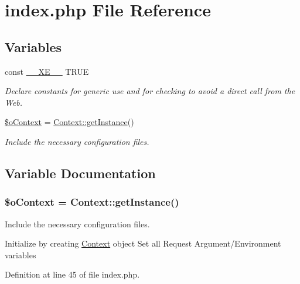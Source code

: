 \hypertarget{index_8php}{}\section{index.\+php File Reference}
\label{index_8php}
\subsection*{Variables}
\begin{DoxyCompactItemize}
\item 
const \hyperlink{index_8php_a697de427d83b791899ae45d555377756}{\+\_\+\+\_\+\+X\+E\+\_\+\+\_\+} T\+R\+UE
\begin{DoxyCompactList}\small\item\em Declare constants for generic use and for checking to avoid a direct call from the Web. \end{DoxyCompactList}\item 
\hyperlink{index_8php_aacfc569bef069a536ba65859b245068b}{\$o\+Context} = \hyperlink{classContext_a399e419617c7fe9b0c9eaf22c431df69}{Context\+::get\+Instance}()
\begin{DoxyCompactList}\small\item\em Include the necessary configuration files. \end{DoxyCompactList}\end{DoxyCompactItemize}


\subsection{Variable Documentation}
\subsubsection[{\texorpdfstring{\$o\+Context}{$oContext}}]{\setlength{\rightskip}{0pt plus 5cm}\$o\+Context = {\bf Context\+::get\+Instance}()}\hypertarget{index_8php_aacfc569bef069a536ba65859b245068b}{}\label{index_8php_aacfc569bef069a536ba65859b245068b}


Include the necessary configuration files. 

Initialize by creating \hyperlink{classContext}{Context} object Set all Request Argument/\+Environment variables 

Definition at line 45 of file index.\+php.

